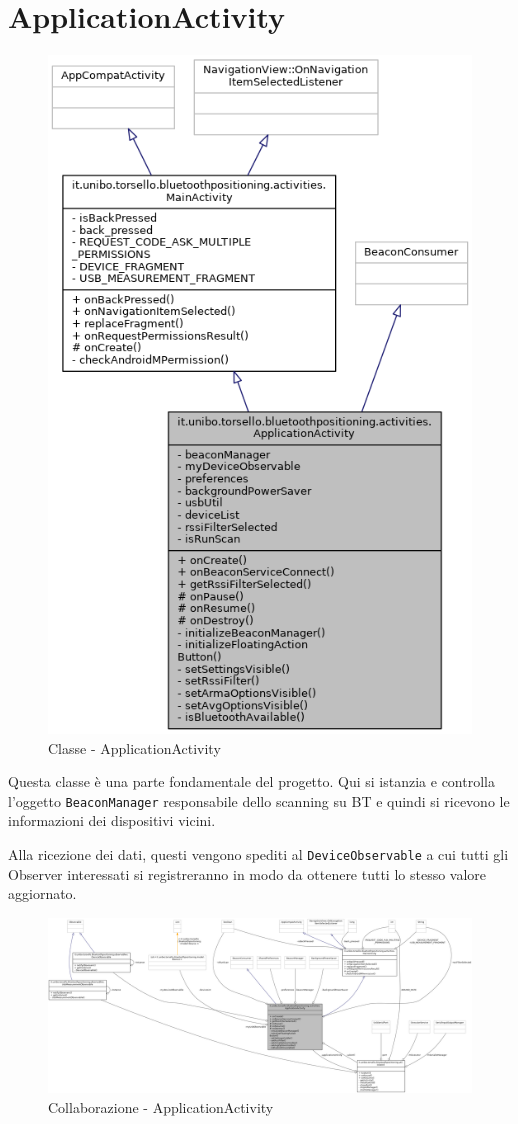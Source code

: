\newpage
\section{ApplicationActivity}
\begin{figure}[ph]
	\centering
	\includegraphics[width=0.7\linewidth]{img/uml/class/classit_1_1unibo_1_1torsello_1_1bluetoothpositioning_1_1activities_1_1ApplicationActivity__inherit__graph.png}
	\caption{Classe - ApplicationActivity}
\end{figure}

Questa classe è una parte fondamentale del progetto. Qui si istanzia e controlla l'oggetto \texttt{BeaconManager} responsabile dello scanning su BT e quindi si ricevono le informazioni dei dispositivi vicini.

Alla ricezione dei dati, questi vengono spediti al \texttt{DeviceObservable} a cui tutti gli Observer interessati si registreranno in modo da ottenere tutti lo stesso valore aggiornato.

\begin{figure}[ph]
	\centering
	\includegraphics[width=1.9\linewidth, angle=90]{img/uml/class/classit_1_1unibo_1_1torsello_1_1bluetoothpositioning_1_1activities_1_1ApplicationActivity__coll__graph.png}
	\caption{Collaborazione - ApplicationActivity}
\end{figure}

